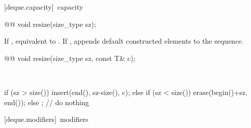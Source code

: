 \documentclass[american,twoside]{book}
\begin{document}
[deque.capacity]{\ capacity}

%
\begin{itemdecl}
@@ 
  void resize(size_type sz);
\end{itemdecl}

\begin{itemdescr}
\pnum
\effects If , equivalent to
. If ,
appends  default constructed elements to the
sequence.

\pnum
{}
\end{itemdescr}

%
\begin{itemdecl}
@@ 
  void resize(size_type sz, const T& c);
\end{itemdecl}

\begin{itemdescr}
\pnum
\effects\ 
\begin{codeblock}
if (sz > size())
  insert(end(), sz-size(), c);
else if (sz < size())
  erase(begin()+sz, end());
else
  ;                 // do nothing
\end{codeblock}

\pnum
{}
\end{itemdescr}

[deque.modifiers]{\ modifiers}
\end{document}
